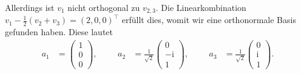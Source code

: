 \documentclass[english, parskip=full]{scrartcl}
\newcommand{\tecxt}{}
\renewcommand{\i}{\text{i}}
\begin{document}
Allerdings ist $v_1$ nicht orthogonal zu $v_{2,3}$.
Die Linearkombination $v_1 - \frac{1}{2}(v_2+v_3) = (2,0,0)^\top$ erfüllt dies, womit wir eine orthonormale Basis gefunden haben.
Diese lautet
\begin{align}
a_1 &= \begin{pmatrix}
1 \\ 0 \\ 0
\end{pmatrix}, &&& a_2 &= \frac{1}{\sqrt{2}}\begin{pmatrix}
0 \\ -\i \\ 1
\end{pmatrix}, &&& a_3 &= \frac{1}{\sqrt{2}}\begin{pmatrix}
0 \\ \i \\ 1
\end{pmatrix}.
\end{align}
\end{document}
